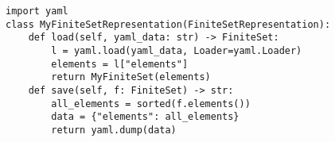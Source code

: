 \par\begin{minipage}{60ex}
\begin{verbatim}
import yaml
class MyFiniteSetRepresentation(FiniteSetRepresentation):
    def load(self, yaml_data: str) -> FiniteSet:
        l = yaml.load(yaml_data, Loader=yaml.Loader)
        elements = l["elements"]
        return MyFiniteSet(elements)
    def save(self, f: FiniteSet) -> str:
        all_elements = sorted(f.elements())
        data = {"elements": all_elements}
        return yaml.dump(data)
\end{verbatim}
\end{minipage}\par